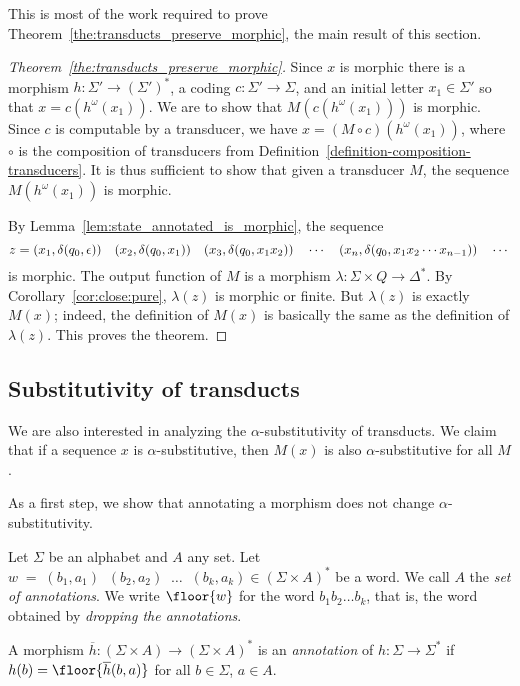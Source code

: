 This is most of the work required to prove
Theorem~\ref{the:transducts_preserve_morphic},
 the main result of this section. 
 
\begin{proof}[Theorem~\ref{the:transducts_preserve_morphic}]  
  Since $x$ is morphic there is a morphism $h: \Sigma' \to (\Sigma')^*$, a coding $c: \Sigma' \to \Sigma$, 
  and an initial letter $x_1 \in \Sigma'$ so that $x = c(h^\omega(x_1))$.   We are to show that $M(c(h^\omega(x_1)))$
  is morphic.    Since $c$ is computable by a transducer, we have
  $x = (M \circ c)(h^\omega(x_1))$, where $\circ$ is the composition of transducers from Definition~\ref{definition-composition-transducers}.
  It is thus sufficient to show that given a transducer $M$, the sequence $M(h^\omega(x_1))$ is morphic.
  
  By Lemma~\ref{lem:state_annotated_is_morphic}, the sequence 
  $$z = (x_1, \delta(q_0, \epsilon)) \quad (x_2, \delta(q_0, x_1))\quad
  (x_3, \delta(q_0, x_1x_2))\quad \cdots\quad (x_n, \delta(q_0, x_1x_2\cdots x_{n-1}))\quad\cdots$$ is morphic. 
  The output function of $M$ is a morphism  $\lambda: \Sigma\times Q \to \Delta^*$.  By 
  Corollary~\ref{cor:close:pure},
$\lambda(z)$ is morphic or finite.   But  $\lambda(z)$ is exactly $M(x)$; indeed, the definition of $M(x)$ is  
  basically the same as the definition of $\lambda(z)$.  This proves the theorem.
\end{proof}



\subsection{Substitutivity of transducts}

We are also interested in analyzing the $\alpha$-substitutivity of transducts. 
We claim that if a sequence $x$ is $\alpha$-substitutive, then $M(x)$ is also $\alpha$-substitutive for all $M$. 

As a first step, we show that annotating a morphism does not change $\alpha$-substitutivity.
\begin{definition}
  Let $\Sigma$ be an alphabet and $A$ any set.
  Let $w \; = \; (b_1,a_1) \;\; (b_2,a_2) \;\;  \ldots \;\;  (b_k,a_k) \in (\Sigma \times A)^*$ be a word.
  We call $A$ the \emph{set of annotations}.
  We write $\floor{w}$ for the word $b_1b_2\ldots b_k$,
  that is, the word obtained by \emph{dropping the annotations}.

  A morphism $\overline{h} : (\Sigma \times A) \to (\Sigma \times A)^*$
  is an \emph{annotation} of $h : \Sigma \to \Sigma^*$
  if $h(b) = \floor{\overline{h}(b,a)}$ for all $b\in\Sigma$, $a \in A$.
\end{definition}

